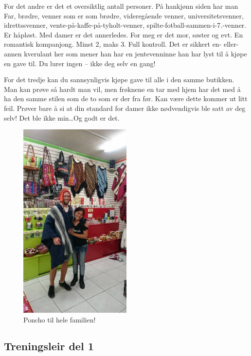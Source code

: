 For det andre er det et oversiktlig antall personer. På hankjønn
siden har man Far, brødre, venner som er som brødre, videregående
venner, universitetsvenner, idrettssvenner, 
vente-på-kaffe-på-tyholt-venner, spilte-fotball-sammen-i-7.-venner. Er
håpløst. Med damer er det
annerledes. For meg er det mor, søster og evt. En romantisk
kompanjong. Minst 2, maks 3. Full kontroll. Det er sikkert en-
eller-annen kverulant her som mener han har en jentevenninne han har lyst
til å kjøpe en gave til. Du lurer ingen -- ikke deg selv en gang!

For det tredje kan du sannsynligvis kjøpe gave til alle i den samme
butikken. Man kan prøve så hardt man vil, men frøknene en tar med hjem
har det med å ha den samme stilen som de to som er der fra før. Kan
være dette kommer ut litt feil. Prøver bare å si at din standard for
damer
ikke nødvendigvis ble satt av deg selv! Det ble ikke min\ldots Og godt
er det.
\begin{figure}[H]
	\centering
	\includegraphics[width=0.5\textwidth]{stjerneiperu}
	\caption*{Poncho til hele familien!}
	\label{fig:stjerne}
\end{figure}


\subsection{Treningsleir del 1}


